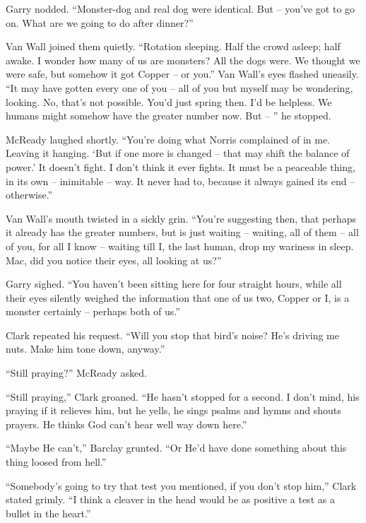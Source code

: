 \documentclass[letterpaper,openany,12pt]{memoir}		%
\begin{document}
Garry nodded. ``Monster-dog and real dog were identical. But -- you've got to go
on. What are we going to do after dinner?''

Van Wall joined them quietly. ``Rotation sleeping. Half the crowd asleep; half
awake. I wonder how many of us are monsters? All the dogs were. We thought we
were safe, but somehow it got Copper -- or you.'' Van Wall's eyes flashed
uneasily. ``It may have gotten every one of you -- all of you but myself may be
wondering, looking. No, that's not possible. You'd just spring then. I'd be
helpless. We humans might somehow have the greater number now. But -- '' he
stopped.

McReady laughed shortly. ``You're doing what Norris complained of in me. Leaving
it hanging. `But if one more is changed -- that may shift the balance of power.'
It doesn't fight. I don't think it ever fights. It must be a peaceable thing, in
its own -- inimitable -- way. It never had to, because it always gained its end
-- otherwise.''

Van Wall's mouth twisted in a sickly grin. ``You're suggesting then, that
perhaps it already has the greater numbers, but is just waiting -- waiting, all
of them -- all of you, for all I know -- waiting till I, the last human, drop my
wariness in sleep. Mac, did you notice their eyes, all looking at us?''

Garry sighed. ``You haven't been sitting here for four straight hours, while all
their eyes silently weighed the information that one of us two, Copper or I, is
a monster certainly -- perhaps both of us.''

Clark repeated his request. ``Will you stop that bird's noise? He's driving me
nuts. Make him tone down, anyway.''

``Still praying?'' McReady asked.

``Still praying,'' Clark groaned. ``He hasn't stopped for a second. I don't
mind, his praying if it relieves him, but he yells, he sings psalms and hymns
and shouts prayers. He thinks God can't hear well way down here.''

``Maybe He can't,'' Barclay grunted. ``Or He'd have done something about this
thing loosed from hell.''

``Somebody's going to try that test you mentioned, if you don't stop him,''
Clark stated grimly. ``I think a cleaver in the head would be as positive a test
as a bullet in the heart.''
\end{document}
